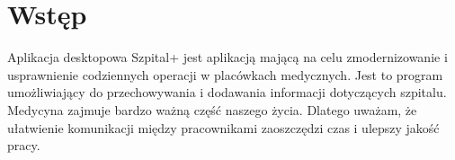 ﻿\chapter*{Wstęp}

\textquotedbl Aplikacja desktopowa Szpital+\textquotedbl{} jest aplikacją mającą na celu zmodernizowanie i usprawnienie codziennych operacji w placówkach medycznych. Jest to program umożliwiający do przechowywania i dodawania informacji dotyczących szpitalu. Medycyna zajmuje bardzo ważną część naszego życia. Dlatego uważam, że ułatwienie komunikacji między pracownikami zaoszczędzi czas i ulepszy jakość pracy.